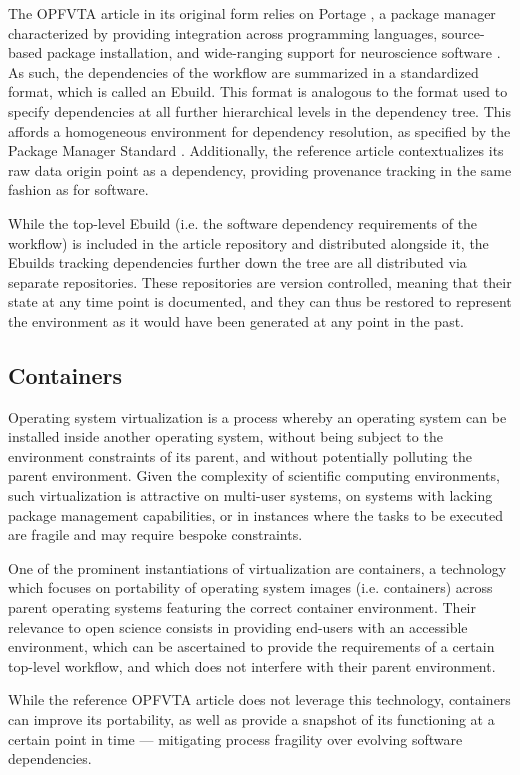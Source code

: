 The OPFVTA article in its original form relies on Portage \supercite{portage}, a package manager characterized by providing integration across programming languages, source-based package installation, and wide-ranging support for neuroscience software \supercite{ng}.
As such, the dependencies of the workflow are summarized in a standardized format, which is called an Ebuild.
This format is analogous to the format used to specify dependencies at all further hierarchical levels in the dependency tree.
This affords a homogeneous environment for dependency resolution, as specified by the Package Manager Standard \supercite{pms}.
Additionally, the reference article contextualizes its raw data origin point as a dependency, providing provenance tracking in the same fashion as for software.

While the top-level Ebuild (i.e. the software dependency requirements of the workflow) is included in the article repository and distributed alongside it, the Ebuilds tracking dependencies further down the tree are all distributed via separate repositories.
These repositories are version controlled, meaning that their state at any time point is documented, and they can thus be restored to represent the environment as it would have been generated at any point in the past.


\subsection{Containers}

Operating system virtualization is a process whereby an operating system can be installed inside another operating system, without being subject to the environment constraints of its parent, and without potentially polluting the parent environment.
Given the complexity of scientific computing environments, such virtualization is attractive on multi-user systems, on systems with lacking package management capabilities, or in instances where the tasks to be executed are fragile and may require bespoke constraints.

One of the prominent instantiations of virtualization are containers, a technology which focuses on portability of operating system images (i.e. containers) across parent operating systems featuring the correct container environment.
Their relevance to open science consists in providing end-users with an accessible environment, which can be ascertained to provide the requirements of a certain top-level workflow, and which does not interfere with their parent environment.

While the reference OPFVTA article does not leverage this technology, containers can improve its portability, as well as provide a snapshot of its functioning at a certain point in time — mitigating process fragility over evolving software dependencies.

